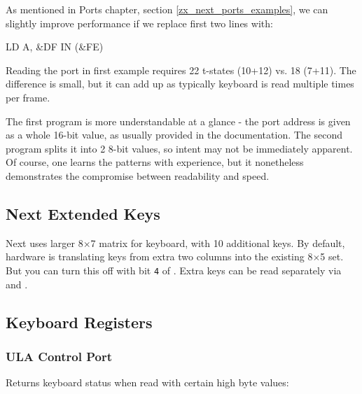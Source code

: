 As mentioned in Ports chapter, section \ref{zx_next_ports_examples}, we can slightly improve performance if we replace first two lines with:

\begin{tcblisting}{}
	LD A, &DF
	IN (&FE)
\end{tcblisting}

Reading the port in first example requires 22 t-states (10+12) vs. 18 (7+11). The difference is small, but it can add up as typically keyboard is read multiple times per frame.

The first program is more understandable at a glance - the port address is given as a whole 16-bit value, as usually provided in the documentation. The second program splits it into 2 8-bit values, so intent may not be immediately apparent. Of course, one learns the patterns with experience, but it nonetheless demonstrates the compromise between readability and speed.


\subsection{Next Extended Keys}

Next uses larger 8$\times$7 matrix for keyboard, with 10 additional keys. By default, hardware is translating keys from extra two columns into the existing 8$\times$5 set. But you can turn this off with bit {\tt 4} of . Extra keys can be read separately via  and .


\subsection{Keyboard Registers}
\label{zx_next_keyboard_registers}

\subsubsection{ULA Control Port }

\vspace*{-1em} %
Returns keyboard status when read with certain high byte values:

